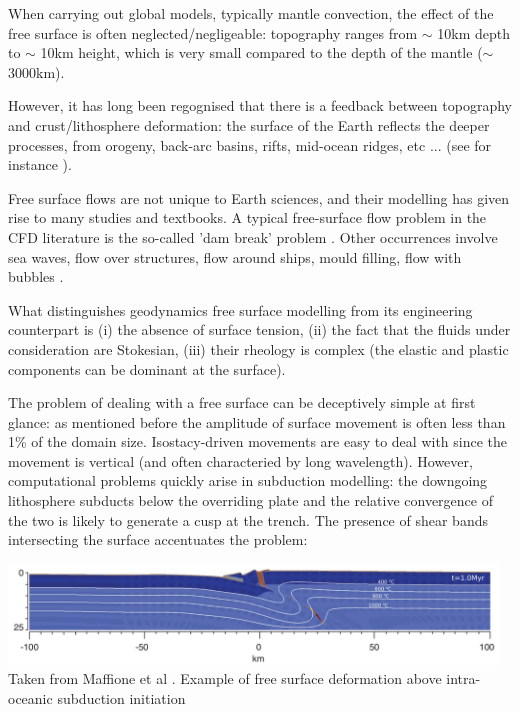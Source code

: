 

When carrying out global models, typically  mantle convection, the effect of the free surface
is often neglected/negligeable: topography ranges from $\sim$ 10km depth to $\sim$ 10km height, which 
is very small compared to the depth of the mantle ($\sim$ 3000km). 

However, it has long been regognised that there is a feedback between topography and crust/lithosphere
deformation: the surface of the Earth reflects the deeper processes, from orogeny, back-arc basins, 
rifts, mid-ocean ridges, etc ... (see for instance \cite{brau10}).

\begin{remark}
Free surface flows are not unique to Earth sciences, and their modelling has given rise to many studies 
and textbooks. A typical free-surface flow problem in the CFD literature is the so-called 'dam break' 
problem \cite{moeb99,bacp07,liir07,lemx08,homa09,anco09}. Other occurrences involve 
sea waves, flow over structures, flow around ships, mould filling, flow with bubbles \cite{liir07}.
\end{remark}
 
What distinguishes geodynamics free surface modelling from its engineering 
counterpart is (i) the absence of surface tension, (ii) the fact that the fluids under consideration are
Stokesian, (iii) their rheology is complex (the elastic and plastic components can be 
dominant at the surface).


The problem of dealing with a free surface can be deceptively simple at first glance: as mentioned before the
amplitude of surface movement is often less than 1\% of the domain size. Isostacy-driven movements are
easy to deal with since the movement is vertical (and often characteried by  long wavelength). However, computational 
problems quickly arise in subduction modelling: the downgoing lithosphere subducts below the 
overriding plate and the relative convergence of the two is likely to generate a cusp at the trench. The presence
of shear bands intersecting the surface accentuates the problem:

\begin{center}
\includegraphics[width=13cm]{images/freesurface/matv15} \\
{\tiny Taken from Maffione et al \cite{matv15}. Example of free surface deformation above 
intra-oceanic subduction initiation}
\end{center}

